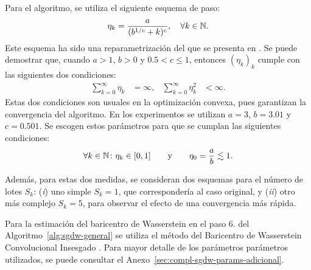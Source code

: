 Para el algoritmo, se utiliza el siguiente esquema de paso:
\begin{equation}
    \eta_k = \frac{a}{(b^{1/c} + k)^c},\quad \forall k \in \mathbb{N}.
\end{equation}
Este esquema ha sido una reparametrización del que se presenta en \cite[Secc. 2]{welling2011bayesian}. Se puede demostrar que, cuando $a > 1$, $b > 0$ y $0.5 < c \leq 1$, entonces $(\eta_k)_{k}$ cumple con las siguientes dos condiciones:
\begin{align}
    \sum_{k=0}^{\infty} \eta_k   & = \infty, &
    \sum_{k=0}^{\infty} \eta_k^2 & < \infty.
\end{align}
Estas dos condiciones son usuales en la optimización convexa, pues garantizan la convergencia del algoritmo. En los experimentos se utilizan $a = 3$, $b = 3.01$ y $c = 0.501$. Se escogen estos parámetros para que se cumplan las siguientes condiciones:
\begin{equation}
    \forall k\in\mathbb{N} \colon \eta_k\in[0, 1]\qquad \text{y} \qquad \eta_0 = \frac{a}{b} \lesssim 1.
\end{equation}

Además, para estas dos medidas, se consideran dos esquemas para el número de lotes $S_k$: (\textit{i}) uno simple $S_k = 1$, que correspondería al caso original, y (\textit{ii}) otro más complejo $S_k = 5$, para observar el efecto de una convergencia más rápida.

Para la estimación del baricentro de Wasserstein en el paso 6. del Algoritmo~\ref{alg:sgdw-general} se utiliza el método del Baricentro de Wasserstein Convolucional Insesgado \cite{janati2020debiased}. Para mayor detalle de los parámetros parámetros utilizados, se puede consultar el Anexo~\ref{sec:compl-sgdw-params-adicional}.


